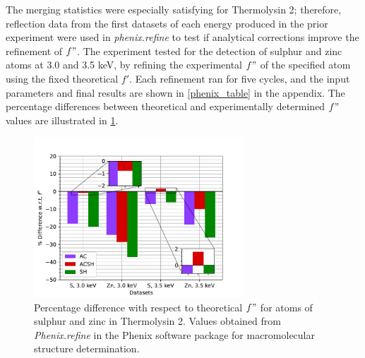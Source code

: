 The merging statistics were especially satisfying for Thermolysin 2; therefore, reflection data from the first datasets of each energy produced 
in the prior experiment were used in \textit{phenix.refine} to test if analytical corrections improve the refinement of $f"$. The experiment tested for the detection of sulphur and zinc atoms at 3.0 and 3.5 \unit{keV}, by refining the experimental $f"$ of the specified atom using the fixed theoretical $f'$. Each refinement ran for five cycles, and the input parameters and final results are shown in \cref{phenix_table} in the appendix. The percentage differences between theoretical and experimentally determined $f"$ values are illustrated in \cref{fig:phenix_plot}.%



\begin{figure}[h]
    \centering
    \includegraphics[width = 0.7\textwidth]{plots/exp1/tlys_2_P6122/FDP_percent_diff.pdf}
    \caption{Percentage difference with respect to theoretical $f"$ for atoms of sulphur and zinc in Thermolysin 2. Values obtained from \textit{Phenix.refine} in the Phenix software package for macromolecular structure determination.}
    \label{fig:phenix_plot}
\end{figure}

